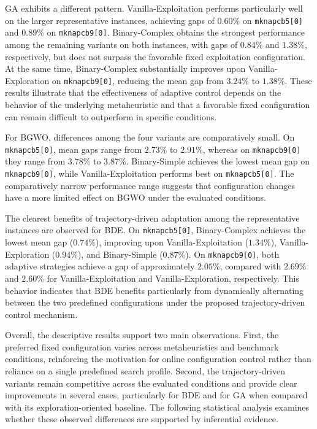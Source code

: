 \documentclass[journal,article,submit,moreauthors]{Definitions/mdpi}
\begin{document}
GA exhibits a different pattern. Vanilla-Exploitation performs particularly
well on the larger representative instances, achieving gaps of $0.60\%$ on
\texttt{mknapcb5[0]} and $0.89\%$ on \texttt{mknapcb9[0]}. Binary-Complex obtains
the strongest performance among the remaining variants on both instances,
with gaps of $0.84\%$ and $1.38\%$, respectively, but does not surpass the
favorable fixed exploitation configuration. At the same time, Binary-Complex
substantially improves upon Vanilla-Exploration on \texttt{mknapcb9[0]},
reducing the mean gap from $3.24\%$ to $1.38\%$. These results illustrate
that the effectiveness of adaptive control depends on the behavior of the
underlying metaheuristic and that a favorable fixed configuration can remain
difficult to outperform in specific conditions.

For BGWO, differences among the four variants are comparatively small.
On \texttt{mknapcb5[0]}, mean gaps range from $2.73\%$ to $2.91\%$, whereas
on \texttt{mknapcb9[0]} they range from $3.78\%$ to $3.87\%$. Binary-Simple
achieves the lowest mean gap on \texttt{mknapcb9[0]}, while
Vanilla-Exploitation performs best on \texttt{mknapcb5[0]}. The comparatively
narrow performance range suggests that configuration changes have a more
limited effect on BGWO under the evaluated conditions.

The clearest benefits of trajectory-driven adaptation among the
representative instances are observed for BDE. On \texttt{mknapcb5[0]},
Binary-Complex achieves the lowest mean gap ($0.74\%$), improving upon
Vanilla-Exploitation ($1.34\%$), Vanilla-Exploration ($0.94\%$), and
Binary-Simple ($0.87\%$). On \texttt{mknapcb9[0]}, both adaptive strategies
achieve a gap of approximately $2.05\%$, compared with $2.69\%$ and
$2.60\%$ for Vanilla-Exploitation and Vanilla-Exploration, respectively.
This behavior indicates that BDE benefits particularly from dynamically
alternating between the two predefined configurations under the proposed
trajectory-driven control mechanism.

Overall, the descriptive results support two main observations. First, the
preferred fixed configuration varies across metaheuristics and benchmark
conditions, reinforcing the motivation for online configuration control
rather than reliance on a single predefined search profile. Second, the
trajectory-driven variants remain competitive across the evaluated
conditions and provide clear improvements in several cases, particularly
for BDE and for GA when compared with its exploration-oriented baseline.
The following statistical analysis examines whether these observed
differences are supported by inferential evidence.
\end{document}
